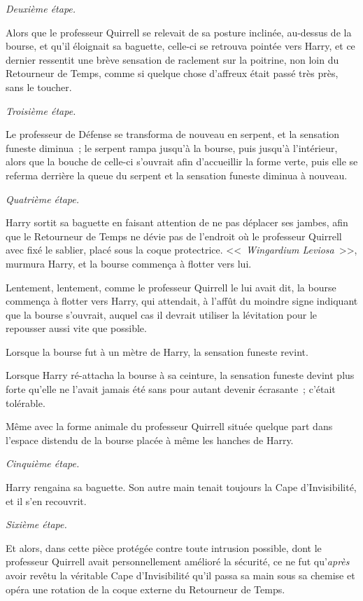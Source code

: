 \emph{Deuxième étape.}

Alors que le professeur Quirrell se relevait de sa posture inclinée, au-dessus de la bourse, et qu'il éloignait sa baguette, celle-ci se retrouva pointée vers Harry, et ce dernier ressentit une brève sensation de raclement sur la poitrine, non loin du Retourneur de Temps, comme si quelque chose d'affreux était passé très près, sans le toucher.

\emph{Troisième étape.}

Le professeur de Défense se transforma de nouveau en serpent, et la sensation funeste diminua~; le serpent rampa jusqu'à la bourse, puis jusqu'à l'intérieur, alors que la bouche de celle-ci s'ouvrait afin d'accueillir la forme verte, puis elle se referma derrière la queue du serpent et la sensation funeste diminua à nouveau.

\emph{Quatrième étape.}

Harry sortit sa baguette en faisant attention de ne pas déplacer ses jambes, afin que le Retourneur de Temps ne dévie pas de l'endroit où le professeur Quirrell avec fixé le sablier, placé sous la coque protectrice. <<~\emph{Wingardium Leviosa}~>>, murmura Harry, et la bourse commença à flotter vers lui.

Lentement, lentement, comme le professeur Quirrell le lui avait dit, la bourse commença à flotter vers Harry, qui attendait, à l'affût du moindre signe indiquant que la bourse s'ouvrait, auquel cas il devrait utiliser la lévitation pour le repousser aussi vite que possible.

Lorsque la bourse fut à un mètre de Harry, la sensation funeste revint.

Lorsque Harry ré-attacha la bourse à sa ceinture, la sensation funeste devint plus forte qu'elle ne l'avait jamais été sans pour autant devenir écrasante~; c'était tolérable.

Même avec la forme animale du professeur Quirrell située quelque part dans l'espace distendu de la bourse placée à même les hanches de Harry.

\emph{Cinquième étape.}

Harry rengaina sa baguette. Son autre main tenait toujours la Cape d'Invisibilité, et il s'en recouvrit.

\emph{Sixième étape.}

Et alors, dans cette pièce protégée contre toute intrusion possible, dont le professeur Quirrell avait personnellement amélioré la sécurité, ce ne fut qu'\emph{après} avoir revêtu la véritable Cape d'Invisibilité qu'il passa sa main sous sa chemise et opéra une rotation de la coque externe du Retourneur de Temps.

